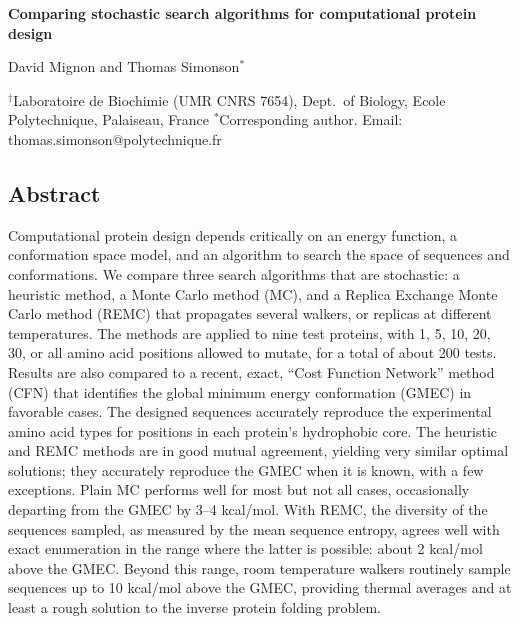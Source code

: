 \documentclass[a4paper,12pt]{article}
\begin{document}
 

\parindent 0mm

\begin{center}

\large 
{\bf Comparing stochastic search algorithms for computational protein design}
\bigskip

\normalsize
David Mignon and Thomas Simonson$^{\ast}$

\vspace{1mm}

$^{\dag}$Laboratoire de Biochimie (UMR CNRS 7654), Dept.\ of Biology, 
Ecole Polytechnique, Palaiseau, France 
$^{\ast}$Corresponding author. Email: thomas.simonson@polytechnique.fr 

\end{center}
\parindent 8mm

\subsection*{Abstract}
Computational protein design depends critically on an energy function, a conformation space model, and an
algorithm to search the space of sequences and conformations. We compare three search algorithms that are
stochastic: a heuristic method, a Monte Carlo method (MC), and a Replica Exchange Monte Carlo method (REMC)
that propagates several walkers, or replicas at different temperatures. The methods are applied to nine test
proteins, with 1, 5, 10, 20, 30, or all amino acid positions allowed to mutate, for a total of about 200 tests.
Results are also compared to a recent, exact, ``Cost Function Network'' method (CFN) that identifies the global
minimum energy conformation (GMEC) in favorable cases. The designed sequences accurately reproduce the experimental
amino acid types for positions in each protein's hydrophobic core. The heuristic and REMC methods are in good
mutual agreement, yielding very similar optimal solutions; they accurately reproduce the GMEC when it is known,
with a few exceptions. Plain MC performs well for most but not all cases, occasionally departing from the GMEC
by 3--4 kcal/mol. With REMC, the diversity of the sequences sampled, as measured by the mean sequence entropy,
agrees well with exact enumeration in the range where the latter is possible: about 2 kcal/mol above the GMEC.
Beyond this range, room temperature walkers routinely sample sequences up to 10 kcal/mol above the GMEC, providing
thermal averages and at least a rough solution to the inverse protein folding problem.
\end{document}
